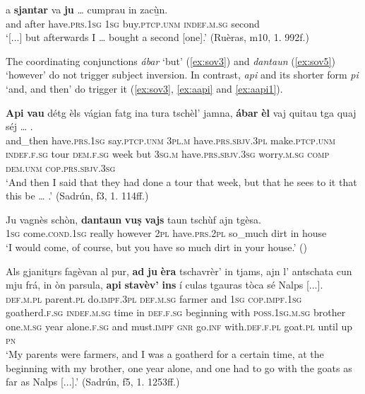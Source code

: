 \ea
\label{ex:sov4}
\gll  [...] a {\ob}\textbf{sjantar}{\cb} va {\ob}{\textbf{ju}}{\cb} … cumprau in zacù̱n.\\
{} and after  have.\textsc{prs.1sg} \textsc{1sg} {} buy.\textsc{ptcp.unm}  \textsc{indef.m.sg} second\\
\glt `[...] but afterwards I … bought a second [one].' (Ruèras, m10, 1. 992f.)
\z


The coordinating conjunctions \textit{ábar} `but' (\ref{ex:sov3}) and \textit{dantaun} (\ref{ex:sov5}) `however' do not trigger subject inversion. In contrast, \textit{api} and its shorter form \textit{pi} `and, and then' do trigger it (\ref{ex:sov3}, \ref{ex:aapi} and \ref{ex:aapi1}).

\ea
\label{ex:sov3}
\gll \textbf{Api} \textbf{vau} détg èls vágian fatg ina tura tschèl’ jamna, \textbf{ábar} \textbf{èl} vaj quitau tga quaj séj … .\\  
and\_then have.\textsc{prs.1sg} say.\textsc{ptcp.unm} \textsc{3pl.m} have.\textsc{prs.sbjv.3pl} make.\textsc{ptcp.unm} \textsc{indef.f.sg} tour  \textsc{dem.f.sg} week but \textsc{3sg.m} have.\textsc{prs.sbjv.3sg} worry.\textsc{m.sg} \textsc{comp} \textsc{dem.unm} \textsc{cop.prs.sbjv.3sg} \\
\glt `And then I said that they had done a tour that week, but that he sees to it that this be … .' (Sadrún, f3, 1. 114ff.)
\z

\ea\label{ex:sov5}
\gll    Ju vagnès schòn, \textbf{dantaun} \textbf{vuṣ} \textbf{vajs} taun tschùf ajn tgèsa.\\
\textsc{1sg} come.\textsc{cond.1sg} really however \textsc{2pl} have.\textsc{prs.2pl} so\_much dirt in house\\
\glt `I would come, of course, but you have so much dirt in your house.' (\citealt[18]{Berther1998})
\z

\ea
\label{ex:aapi}
\gll    Als gjanitu̱rs fagèvan al pur, \textbf{ad} \textbf{ju} \textbf{èra} tschavrèr’ in tjams, ajn l’ antschata cun mju frá, in òn parsula, \textbf{api} \textbf{stavèv’} \textbf{ins} í culas tgauras tòca sé Nalps [...]. \\
\textsc{def.m.pl} parent.\textsc{pl} do.\textsc{impf.3pl} \textsc{def.m.sg} farmer and \textsc{1sg} \textsc{cop.impf.1sg} goatherd.\textsc{f.sg} \textsc{indef.m.sg} time in \textsc{def.f.sg} beginning with \textsc{poss.1sg.m.sg} brother one.\textsc{m.sg} year alone.\textsc{f.sg}  and  must.\textsc{impf} \textsc{gnr} go.\textsc{inf} with.\textsc{def.f.pl} goat.\textsc{pl} until up  \textsc{pn} \\
\glt `My parents were farmers, and I was a goatherd for a certain time, at the beginning with my brother, one year alone, and one had to go with the goats as far as Nalps [...].' (Sadrún, f5, 1. 1253ff.)
\z

